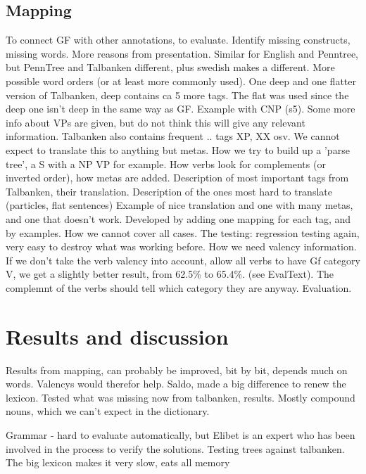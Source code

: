 \documentclass{article}
\begin{document}
\subsection{Mapping}
To connect GF with other annotations, to evaluate. Identify missing constructs,
missing words. More reasons from presentation.
Similar for English and Penntree, but PennTree and Talbanken different, plus swedish
makes a different. More possible word orders (or at least more commonly used).
One deep and one flatter version of Talbanken, deep contains ca 5 more tags.
The flat was used since the deep one
isn't deep in the same way as GF. Example with CNP (s5). Some
more info about VPs are given, but do not think this will give any relevant information.
Talbanken also contains frequent .. tags XP, XX osv. We cannot expect to translate
this to anything but metas.
How we try to build up a 'parse tree', a S with a NP VP for example. 
How verbs look for complements (or inverted order), how metas are added.
Description of most important tags from Talbanken, their translation.
Description of the ones most hard to translate (particles, flat sentences)
Example of nice translation and one with many metas, and one that doesn't work.
Developed by adding one mapping for each tag, and by examples.
How we cannot cover all cases. The testing: regression testing again,
very easy to destroy what was working before. 
How we need valency information.
If we don't take the verb valency into account, allow all verbs to have Gf category V,
we get a slightly better result,
from 62.5\% to 65.4\%.  (see EvalText). The complemnt of the verbs should tell which category
they are anyway.
Evaluation. 



\section{Results and discussion}
Results from mapping, can probably be improved, bit by bit, depends much on words.
Valencys would therefor help.  
Saldo, made a big difference to renew the lexicon. Tested what was missing now from talbanken,
results. Mostly compound nouns, which we can't expect in the dictionary.

Grammar - hard to evaluate automatically, but Elibet is an expert who has been involved
in the process to verify the solutions. Testing trees against talbanken.
The big lexicon makes it very slow, eats all memory
\end{document}
